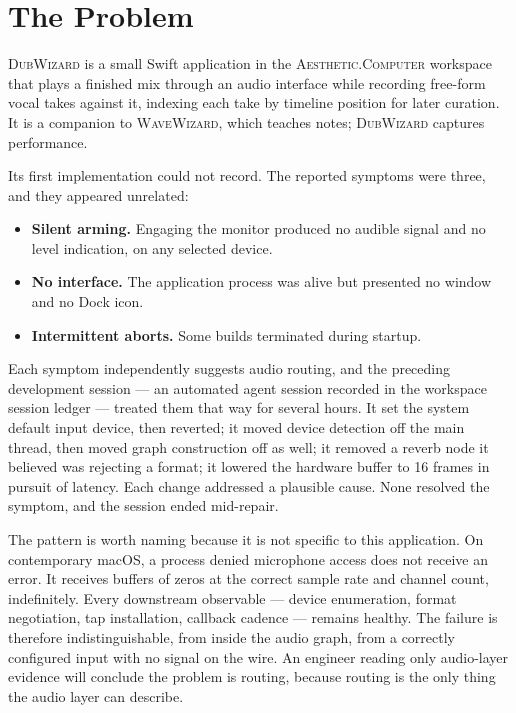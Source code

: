 \documentclass[10pt,letterpaper,twocolumn]{article}
\newcommand{\ac}{\textsc{Aesthetic.Computer}}
\newcommand{\app}{\textsc{DubWizard}}
\begin{document}
\section{The Problem}

\app{} is a small Swift application in the \ac{} workspace that plays a finished mix through an audio interface while recording free-form vocal takes against it, indexing each take by timeline position for later curation. It is a companion to \textsc{WaveWizard}, which teaches notes; \app{} captures performance.

Its first implementation could not record. The reported symptoms were three, and they appeared unrelated:

\begin{itemize}
  \item \textbf{Silent arming.} Engaging the monitor produced no audible signal and no level indication, on any selected device.
  \item \textbf{No interface.} The application process was alive but presented no window and no Dock icon.
  \item \textbf{Intermittent aborts.} Some builds terminated during startup.
\end{itemize}

Each symptom independently suggests audio routing, and the preceding development session --- an automated agent session recorded in the workspace session ledger --- treated them that way for several hours. It set the system default input device, then reverted; it moved device detection off the main thread, then moved graph construction off as well; it removed a reverb node it believed was rejecting a format; it lowered the hardware buffer to 16 frames in pursuit of latency. Each change addressed a plausible cause. None resolved the symptom, and the session ended mid-repair.

The pattern is worth naming because it is not specific to this application. On contemporary macOS, a process denied microphone access does not receive an error. It receives buffers of zeros at the correct sample rate and channel count, indefinitely. Every downstream observable --- device enumeration, format negotiation, tap installation, callback cadence --- remains healthy. The failure is therefore indistinguishable, from inside the audio graph, from a correctly configured input with no signal on the wire. An engineer reading only audio-layer evidence will conclude the problem is routing, because routing is the only thing the audio layer can describe.
\end{document}
